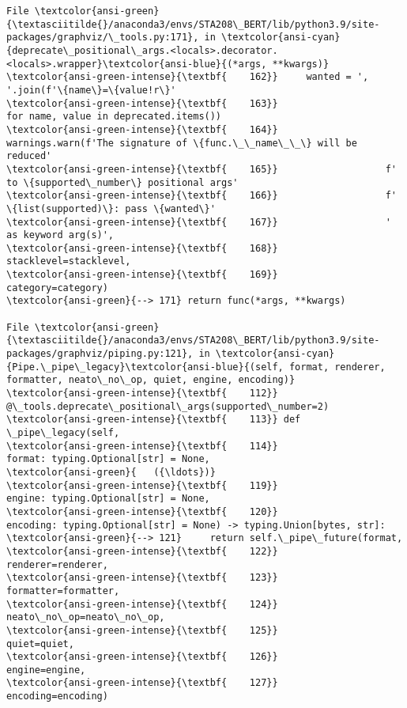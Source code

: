 \documentclass[11pt]{article}
\begin{document}
\begin{Verbatim}[commandchars=\\\{\}, frame=single, framerule=2mm, rulecolor=\color{outerrorbackground}]
File \textcolor{ansi-green}{\textasciitilde{}/anaconda3/envs/STA208\_BERT/lib/python3.9/site-packages/graphviz/\_tools.py:171}, in \textcolor{ansi-cyan}{deprecate\_positional\_args.<locals>.decorator.<locals>.wrapper}\textcolor{ansi-blue}{(*args, **kwargs)}
\textcolor{ansi-green-intense}{\textbf{    162}}     wanted = ', '.join(f'\{name\}=\{value!r\}'
\textcolor{ansi-green-intense}{\textbf{    163}}                        for name, value in deprecated.items())
\textcolor{ansi-green-intense}{\textbf{    164}}     warnings.warn(f'The signature of \{func.\_\_name\_\_\} will be reduced'
\textcolor{ansi-green-intense}{\textbf{    165}}                   f' to \{supported\_number\} positional args'
\textcolor{ansi-green-intense}{\textbf{    166}}                   f' \{list(supported)\}: pass \{wanted\}'
\textcolor{ansi-green-intense}{\textbf{    167}}                   ' as keyword arg(s)',
\textcolor{ansi-green-intense}{\textbf{    168}}                   stacklevel=stacklevel,
\textcolor{ansi-green-intense}{\textbf{    169}}                   category=category)
\textcolor{ansi-green}{--> 171} return func(*args, **kwargs)

File \textcolor{ansi-green}{\textasciitilde{}/anaconda3/envs/STA208\_BERT/lib/python3.9/site-packages/graphviz/piping.py:121}, in \textcolor{ansi-cyan}{Pipe.\_pipe\_legacy}\textcolor{ansi-blue}{(self, format, renderer, formatter, neato\_no\_op, quiet, engine, encoding)}
\textcolor{ansi-green-intense}{\textbf{    112}} @\_tools.deprecate\_positional\_args(supported\_number=2)
\textcolor{ansi-green-intense}{\textbf{    113}} def \_pipe\_legacy(self,
\textcolor{ansi-green-intense}{\textbf{    114}}                  format: typing.Optional[str] = None,
\textcolor{ansi-green}{   ({\ldots})}
\textcolor{ansi-green-intense}{\textbf{    119}}                  engine: typing.Optional[str] = None,
\textcolor{ansi-green-intense}{\textbf{    120}}                  encoding: typing.Optional[str] = None) -> typing.Union[bytes, str]:
\textcolor{ansi-green}{--> 121}     return self.\_pipe\_future(format,
\textcolor{ansi-green-intense}{\textbf{    122}}                              renderer=renderer,
\textcolor{ansi-green-intense}{\textbf{    123}}                              formatter=formatter,
\textcolor{ansi-green-intense}{\textbf{    124}}                              neato\_no\_op=neato\_no\_op,
\textcolor{ansi-green-intense}{\textbf{    125}}                              quiet=quiet,
\textcolor{ansi-green-intense}{\textbf{    126}}                              engine=engine,
\textcolor{ansi-green-intense}{\textbf{    127}}                              encoding=encoding)


\end{Verbatim}
\end{document}
